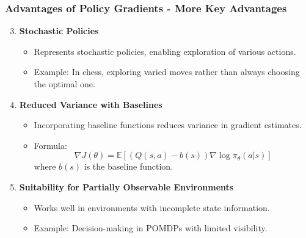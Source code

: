 \documentclass[aspectratio=169]{beamer}
\begin{document}
\begin{frame}[fragile]
    \frametitle{Advantages of Policy Gradients - More Key Advantages}
    \begin{enumerate}
        \setcounter{enumi}{2} %
        \item \textbf{Stochastic Policies}
            \begin{itemize}
                \item Represents stochastic policies, enabling exploration of various actions.
                \item Example: In chess, exploring varied moves rather than always choosing the optimal one.
            \end{itemize}
        
        \item \textbf{Reduced Variance with Baselines}
            \begin{itemize}
                \item Incorporating baseline functions reduces variance in gradient estimates.
                \item Formula:
                \begin{equation}
                    \nabla J(\theta) = \mathbb{E}[(Q(s, a) - b(s)) \nabla \log \pi_\theta(a|s)]
                \end{equation}
                where \(b(s)\) is the baseline function.
            \end{itemize}

        \item \textbf{Suitability for Partially Observable Environments}
            \begin{itemize}
                \item Works well in environments with incomplete state information.
                \item Example: Decision-making in POMDPs with limited visibility.
            \end{itemize}
    \end{enumerate}
\end{frame}
\end{document}
